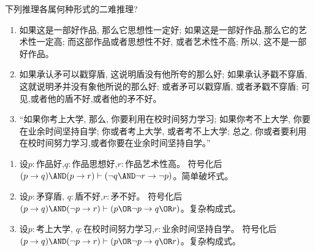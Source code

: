 \documentclass{ctexart}
\begin{document}
\begin{problem}\label{pro:3}
  下列推理各属何种形式的二难推理?
  \begin{enumerate}
    \item 如果这是一部好作品, 那么它思想性一定好; 如果这是一部好作品,那么它的艺术性一定高; 而这部作品或者思想性不好, 或者艺术性不高; 所以, 这不是一部好作品。
    \item 如果承认矛可以戳穿盾, 这说明盾没有他所夸的那么好; 如果承认矛戳不穿盾, 这就说明矛并没有象他所说的那么好; 或者矛可以戳穿盾, 或者矛戳不穿盾; 可见,或者他的盾不好,或者他的矛不好。
    \item “如果你考上大学, 那么, 你要利用在校时间努力学习; 如果你考不上大学, 你要在业余时间坚持自学; 你或者考上大学, 或者考不上大学; 总之, 你或者要利用在校时间努力学习,或者你要在业余时间坚持自学。”
  \end{enumerate}
\end{problem}
\begin{solution}
  \begin{enumerate}
    \item 设\(p:\text{作品好}\),\(q:\text{作品思想好}\),\(r:\text{作品艺术性高}\)。
      符号化后\((p \to q)\AND (p \to r) \vdash (\neg q \AND \neg r \to \neg p)\)。简单破坏式。
    \item 设\(p : \text{矛穿盾}\), \(q :\text{盾不好}\),\(r:\text{矛不好}\)。
      符号化后\((p \to q)\AND (\neg p \to r) \vdash ( p \OR \neg p \to q \OR r )\)。复杂构成式。
    \item 设\(p:\text{考上大学}\), \(q:\text{在校时间努力学习}\),\(r:\text{业余时间坚持自学}\)。
      符号化后\((p \to q)\AND (\neg p \to r) \vdash ( p \OR \neg p \to q \OR r )\)。复杂构成式。
  \end{enumerate}

\end{solution}
\end{document}
